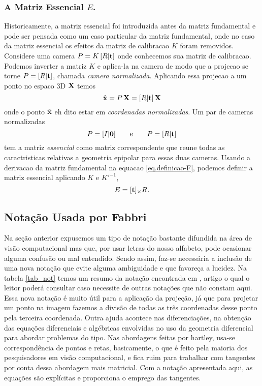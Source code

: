 \subsubsection{A Matriz Essencial $E$.}
Historicamente, a matriz essencial foi introduzida antes da matriz fundamental e pode ser pensada como um caso particular da matriz fundamental, onde no caso da matriz essencial os efeitos da matriz de calibracao $K$ foram removidos. Considere uma camera $P=K\,[R|{\bf t}]$ onde conhecemos sua matriz de calibracao. Podemos inverter a matriz $K$ e aplica-la na camera de modo que a projecao se torne $P=[R|{\bf t}]$, chamada {\it camera normalizada}. Aplicando essa projecao a um ponto no espaco 3D $\mathbf{X}$ temos 
\begin{equation*}
\hat{\mathbf{x}}=P\,\mathbf{X}=[R|{\bf t}]\,\mathbf{X}
\end{equation*}
onde o ponto $\hat{\mathbf{x}}$ eh dito estar em {\it coordenadas  normalizadas}. Um par de cameras normalizadas 
\begin{equation*}
P=[I|{\bf 0}]\qquad\text{e}\qquad P=[R|{\bf t}]
\end{equation*}
tem a matriz {\it essencial} como matriz correspondente que reune todas as caractristicas relativas a geometria epipolar para essas duas cameras. Usando a derivacao da matriz fundamental na equacao \ref{eq.definicao-F}, podemos definir a matriz essencial aplicando $K$ e $K'^{-1}$,
\begin{equation*}
E=[{\bf t}]_\times R.
\end{equation*}





\subsection{Notação Usada por Fabbri}

Na seção anterior expusemos um tipo de notação bastante difundida na área de visão computacional mas que, por usar letras do nosso alfabeto, pode ocasionar alguma confusão ou mal entendido. Sendo assim, faz-se necessária a inclusão de uma nova notação que evite alguma ambiguidade e que favoreça a lucidez. Na tabela \ref{tab_not} temos um resumo da notação encontrada em \cite{Fabbri:Kimia:IJCV2015}, artigo o qual o leitor poderá consultar caso necessite de outras notações que não constam aqui. Essa nova notação é muito útil para a aplicação da projeção, já que para projetar um ponto na imagem fazemos a divisão de todas as três coordenadas desse ponto pela terceira coordenada. Outra ajuda acontece nas diferenciações, na obtenção das equações diferenciais e algébricas envolvidas no uso da geometria diferencial para abordar problemas do tipo. Nas abordagens feitas por hartley, usa-se correspondência de pontos e retas, basicamente, o que é feito pela maioria dos pesquisadores em visão computacional, e fica ruim para trabalhar com tangentes por conta dessa abordagem mais matricial. Com a notação apresentada aqui, as equações são explícitas e proporciona o emprego das tangentes.

